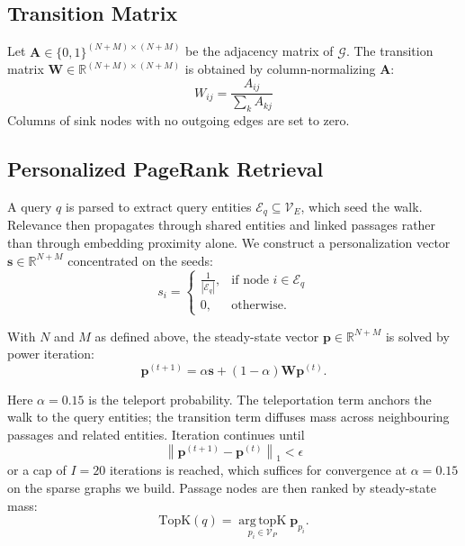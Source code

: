 \documentclass[runningheads]{llncs}
\begin{document}
\subsection{Transition Matrix}

Let $\mathbf{A} \in \{0,1\}^{(N+M) \times (N+M)}$ be the adjacency matrix of $\mathcal{G}$. The transition matrix $\mathbf{W} \in \mathbb{R}^{(N+M) \times (N+M)}$ is obtained by column-normalizing $\mathbf{A}$:
\begin{equation}
W_{ij} = \frac{A_{ij}}{\sum_{k} A_{kj}}
\end{equation}
Columns of sink nodes with no outgoing edges are set to zero.

\subsection{Personalized PageRank Retrieval}

A query $q$ is parsed to extract query entities $\mathcal{E}_q \subseteq \mathcal{V}_E$, which seed the walk. Relevance then propagates through shared entities and linked passages rather than through embedding proximity alone. We construct a personalization vector $\mathbf{s} \in \mathbb{R}^{N+M}$ concentrated on the seeds:
\begin{equation}
s_i =
\begin{cases}
\frac{1}{|\mathcal{E}_q|}, & \text{if node } i \in \mathcal{E}_q \\
0, & \text{otherwise}.
\end{cases}
\end{equation}

With $N$ and $M$ as defined above, the steady-state vector $\mathbf{p} \in \mathbb{R}^{N+M}$ is solved by power iteration:
\begin{equation}
\mathbf{p}^{(t+1)} = \alpha \mathbf{s} + (1 - \alpha)\mathbf{W}\mathbf{p}^{(t)}.
\end{equation}

Here $\alpha = 0.15$ is the teleport probability. The teleportation term anchors the walk to the query entities; the transition term diffuses mass across neighbouring passages and related entities. Iteration continues until
\begin{equation}
\left\|\mathbf{p}^{(t+1)} - \mathbf{p}^{(t)}\right\|_1 < \epsilon
\end{equation}
or a cap of $I = 20$ iterations is reached, which suffices for convergence at $\alpha = 0.15$ on the sparse graphs we build. Passage nodes are then ranked by steady-state mass:
\begin{equation}
\mathrm{TopK}(q) =
\operatorname*{arg\,topK}_{p_i \in \mathcal{V}_P} \mathbf{p}_{p_i}.
\end{equation}
\end{document}
